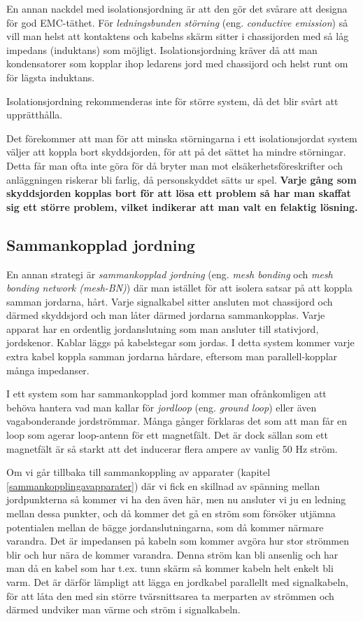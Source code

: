 En annan nackdel med isolationsjordning är att den gör det svårare att designa
för god EMC-täthet. För \emph{ledningsbunden störning} (eng. \emph{conductive
emission}) så vill man helst att kontaktens och kabelns skärm sitter i
chassijorden med så låg impedans (induktans) som möjligt. Isolationsjordning
kräver då att man kondensatorer som kopplar ihop ledarens jord med chassijord
och helst runt om för lägsta induktans.

Isolationsjordning rekommenderas inte för större system, då det blir svårt
att upprätthålla.

Det förekommer att man för att minska störningarna i ett isolationsjordat
system väljer att koppla bort skyddsjorden, för att på det sättet ha mindre
störningar. Detta får man ofta inte göra för då bryter man mot
elsäkerhetsföreskrifter och anläggningen riskerar bli farlig, då personskyddet
sätts ur spel. \textbf{Varje gång som skyddsjorden kopplas bort för att lösa ett
problem så har man skaffat sig ett större problem, vilket indikerar att man
valt en felaktig lösning.}

\subsection{Sammankopplad jordning}

En annan strategi är \emph{sammankopplad jordning} (eng. \emph{mesh bonding}
och \emph{mesh bonding network (mesh-BN)}) \cite[3.2.3]{K27-1991}
där man istället för att isolera satsar på att koppla samman jordarna, hårt.
Varje signalkabel sitter ansluten mot chassijord och därmed skyddsjord och
man låter därmed jordarna sammankopplas. Varje apparat har en ordentlig
jordanslutning som man ansluter till stativjord, jordskenor. Kablar läggs på
kabelstegar som jordas. I detta system kommer varje extra kabel koppla samman
jordarna hårdare, eftersom man parallell-kopplar många impedanser.

I ett system som har sammankopplad jord kommer man ofrånkomligen att behöva
hantera vad man kallar för \emph{jordloop} (eng. \emph{ground loop}) eller även
vagabonderande jordströmmar. Många gånger förklaras det som att man får en
loop som agerar loop-antenn för ett magnetfält. Det är dock sällan som ett
magnetfält är så starkt att det inducerar flera ampere av vanlig 50 Hz ström.

Om vi går tillbaka till sammankoppling av apparater (kapitel
\ref{sammankopplingavapparater}) där vi fick en skillnad av spänning mellan
jordpunkterna så kommer vi ha den även här, men nu ansluter vi ju en ledning
mellan dessa punkter, och då kommer det gå en ström som försöker utjämna
potentialen mellan de bägge jordanslutningarna, som då kommer närmare varandra.
Det är impedansen på kabeln som kommer avgöra hur stor strömmen blir och hur
nära de kommer varandra. Denna ström kan bli ansenlig och har man då en kabel
som har t.ex. tunn skärm så kommer kabeln helt enkelt bli varm. Det är därför
lämpligt att lägga en jordkabel parallellt med signalkabeln, för att låta den
med sin större tvärsnittsarea ta merparten av strömmen och därmed undviker man
värme och ström i signalkabeln.

